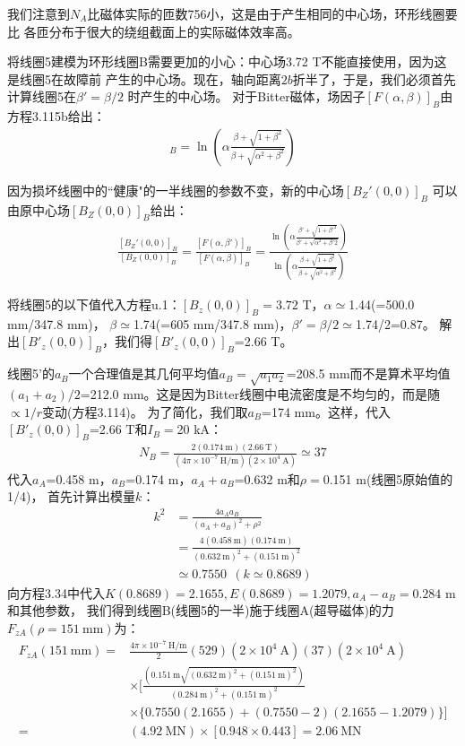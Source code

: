 我们注意到$N_A$比磁体实际的匝数756小，这是由于产生相同的中心场，环形线圈要比
各匝分布于很大的绕组截面上的实际磁体效率高。

将线圈5建模为环形线圈B需要更加的小心：中心场3.72 T不能直接使用，因为这是线圈5在故障前
产生的中心场。现在，轴向距离$2b$折半了，于是，我们必须首先计算线圈5在$\beta'=\beta/2$
时产生的中心场。
对于Bitter磁体，场因子$[F(\alpha,\beta)]_B$由方程3.115b给出：
\begin{align*}%
[F(\alpha,\beta)]_B=\ln(\alpha\frac{\beta+\sqrt{1+\beta^2}}{\beta+\sqrt{\alpha^2+\beta^2}}) \tag{3.115b}
\end{align*}

因为损坏线圈中的``健康"的一半线圈的参数不变，新的中心场$[B_Z'(0,0)]_B$
可以由原中心场$[B_Z(0,0)]_B$给出：
\begin{align*}%
\frac{[B_Z'(0,0)]_B}{[B_Z(0,0)]_B}
=\frac{[F(\alpha,\beta')]_B}{[F(\alpha,\beta)]_B}
=\frac{\ln(\alpha\frac{\beta'+\sqrt{1+\beta'^2}}{\beta'+\sqrt{\alpha^2+\beta'2}})}{\ln(\alpha\frac{\beta+\sqrt{1+\beta^2}}{\beta+\sqrt{\alpha^2+\beta^2}})} \tag{u.1}
\end{align*}

将线圈5的以下值代入方程u.1：$[B_z(0,0)]_B=3.72$ T，$\alpha\simeq$1.44(=500.0 mm/347.8 mm)，
$\beta\simeq$1.74(=605 mm/347.8 mm)，$\beta'=\beta/2\simeq$1.74/2=0.87。
解出$[B'_z(0,0)]_B$，我们得$[B'_z(0,0)]_B$=2.66 T。

线圈5'的$a_B$一个合理值是其几何平均值$a_B=\sqrt{a_1 a_2}$=208.5 mm而不是算术平均值
$(a_1+a_2)/2$=212.0 mm。这是因为Bitter线圈中电流密度是不均匀的，而是随$\propto 1/r$变动(方程3.114)。
为了简化，我们取$a_B$=174 mm。这样，代入$[B'_z(0,0)]_B$=2.66 T和$I_B=$20 kA：
\begin{align*}%
N_B=\frac{2(0.174\ \mathrm{m})(2.66\ \mathrm{T})}{(4\pi\times 10^{-7}\ \mathrm{H/m})(2\times 10^4\ \mathrm{A})}\simeq 37
\end{align*}
代入$a_A$=0.458 m，$a_B$=0.174 m，$a_A+a_B$=0.632 m和$\rho=$0.151 m(线圈5原始值的1/4)，
首先计算出模量$k$：
\begin{align*}%
k^2&=\frac{4a_Aa_B}{(a_A+a_B)^2+\rho^2}\\ \tag{3.36}
&=\frac{4(0.458\ \mathrm{m})(0.174\ \mathrm{m})}{(0.632\ \mathrm{m})^2+(0.151\ \mathrm{m})^2}\\
&\simeq 0.7550\ \ (k\simeq 0.8689)
\end{align*}
向方程3.34中代入$K(0.8689)=2.1655, E(0.8689)=1.2079, a_A-a_B=0.284$ m和其他参数，
我们得到线圈B(线圈5的一半)施于线圈A(超导磁体)的力$F_{zA}(\rho=151\ \mathrm{mm})$为：
\begin{align*}%
F_{zA}(151\ \mathrm{mm})=&\frac{4\pi\times10^{-7}\ \mathrm{H/m}}{2}(529)(2\times 10^4\ \mathrm{A})(37)(2\times 10^4\ \mathrm{A})\\
&\times[\frac{(0.151\ \mathrm{m}\sqrt{(0.632\ \mathrm{m})^2+(0.151 \ \mathrm{m})^2})}{(0.284\ \mathrm{m})^2+(0.151\ \mathrm{m})^2}\\
&\times\{0.7550(2.1655)+(0.7550-2)(2.1655-1.2079)\}]\\
=&(4.92\ \mathrm{MN})\times[0.948\times 0.443]=2.06\ \mathrm{MN}
\end{align*}

